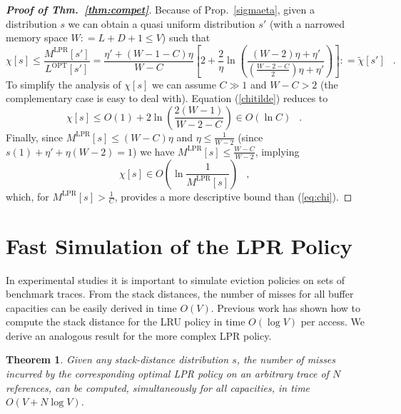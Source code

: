 \documentclass[11pt,a4paper]{article}
\DeclareMathOperator{\opt}{OPT}
\DeclareMathOperator{\lpr}{LPR}
\DeclareMathOperator{\mf}{\enspace .}
\DeclareMathOperator{\mc}{\enspace ,}
\newcommand{\deq}{\mathrel{\mathop:}=}
\newtheorem{theorem}{Theorem}
\theoremstyle{definition}
\theoremstyle{remark}
\begin{document}
\begin{proof}[{\bf Proof of Thm.~\ref{thm:compet}}]
  Because of Prop.~\ref{sigmaeta}, given a distribution $s$ we can obtain
  a quasi uniform distribution $s'$ (with a narrowed memory space 
  $W \deq L+D+1\leq V$) such that
  \begin{equation}\label{chitilde}
    \chi[s] \leq \frac{M^{\lpr}[s']}{L^{\opt}[s']}
    = \frac{\eta'+(W-1-C)\eta}{W-C}  \left[2+\frac{2}{\eta}\ln\left(
        \frac{(W-2)\eta+\eta'}{\left(\frac{W-2-C}{2}\right)\eta+\eta'}\right)\right]
    \deq \tilde\chi[s'] \mf
  \end{equation}
  To simplify the analysis of $\chi[s]$ we can assume $C \gg 1$ and $W-C>2$ (the
  complementary case is easy to deal with). Equation (\ref{chitilde}) reduces to
  \begin{equation}
    \label{eq:chi}
    \chi[s] \leq  O(1) + 2 \ln\left(\frac{2(W-1)}{W-2-C}\right) \in
    O\left(\ln C\right) \mf
  \end{equation}
    Finally, since $M^{\lpr}[s] \leq (W-C)\eta$ and $\eta \leq \frac{1}{W-2}$
  (since $s(1)+\eta'+\eta(W-2)=1$) we have $M^{\lpr}[s] \leq \frac{W-C}{W-2}$, implying
  \begin{equation}
    \chi[s] \in O\left(\ln\frac{1}{M^{\lpr}[s]}\right) \mc
  \end{equation}
  which, for $M^{\lpr}[s]>\frac{1}{C}$, provides a more descriptive bound than
  (\ref{eq:chi}).
\end{proof}







\section{Fast Simulation of the LPR Policy}
\label{sec:fast-simul-optim}


In experimental studies it is important to simulate eviction
policies on sets of benchmark traces.  From the stack distances, the
number of misses for all buffer capacities can be easily derived in
time $O(V)$.  Previous work \cite{BennettK75,AlmasiCP02} has shown how
to compute the stack distance for the LRU policy in time $O(\log V)$
per access. We derive an analogous result for the more complex LPR
policy.

\begin{theorem}\label{thm:lpr-stack-up}
  Given any stack-distance distribution $s$, the number of misses
  incurred by the corresponding optimal LPR policy on an arbitrary
  trace of $N$ references, can be computed, simultaneously for all
  capacities, in time $O(V+N \log V)$.
\end{theorem}
\end{document}
